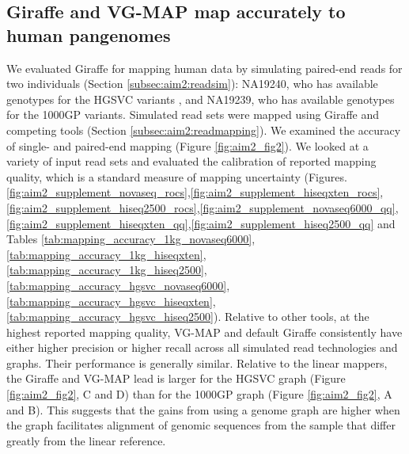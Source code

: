 \documentclass[11pt]{ucscthesis}
\begin{document}
\subsection{Giraffe and VG-MAP map accurately to human pangenomes}
We evaluated Giraffe for mapping human data by simulating paired-end reads for two individuals (Section \ref{subsec:aim2:readsim}): NA19240, who has available genotypes for the HGSVC variants \cite{chaisson_sv_2019}, and NA19239, who has available genotypes for the 1000GP variants\cite{1000gp_2015}.
Simulated read sets were mapped using Giraffe and competing tools (Section \ref{subsec:aim2:readmapping}).
We examined the accuracy of single- and paired-end mapping (Figure \ref{fig:aim2_fig2}).
We looked at a variety of input read sets and evaluated the calibration of reported mapping quality, which is a standard measure of mapping uncertainty (Figures.\ref{fig:aim2_supplement_novaseq_rocs},\ref{fig:aim2_supplement_hiseqxten_rocs},\ref{fig:aim2_supplement_hiseq2500_rocs},\ref{fig:aim2_supplement_novaseq6000_qq},\ref{fig:aim2_supplement_hiseqxten_qq},\ref{fig:aim2_supplement_hiseq2500_qq} and Tables \ref{tab:mapping_accuracy_1kg_novaseq6000},\ref{tab:mapping_accuracy_1kg_hiseqxten},\ref{tab:mapping_accuracy_1kg_hiseq2500},\ref{tab:mapping_accuracy_hgsvc_novaseq6000},\ref{tab:mapping_accuracy_hgsvc_hiseqxten},\ref{tab:mapping_accuracy_hgsvc_hiseq2500}).
Relative to other tools, at the highest reported mapping quality, VG-MAP and default Giraffe consistently have either higher precision or higher recall across all simulated read technologies and graphs.
Their performance is generally similar.
Relative to the linear mappers, the Giraffe and VG-MAP lead is larger for the HGSVC graph (Figure \ref{fig:aim2_fig2}, C and D) than for the 1000GP graph (Figure \ref{fig:aim2_fig2}, A and B).
This suggests that the gains from using a genome graph are higher when the graph facilitates alignment of genomic sequences from the sample that differ greatly from the linear reference.
\end{document}
